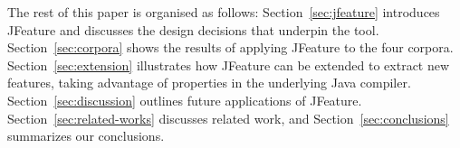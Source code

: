 The rest of this paper is organised as follows:
Section~\ref{sec:jfeature} introduces JFeature and discusses the design decisions that underpin the tool.
Section~\ref{sec:corpora} shows the results of applying JFeature to the four corpora.
Section~\ref{sec:extension} illustrates how JFeature can be extended to extract new features, taking advantage of properties in the underlying Java compiler.
Section~\ref{sec:discussion} outlines future applications of JFeature.
Section~\ref{sec:related-works} discusses related work, and
Section~\ref{sec:conclusions} summarizes our conclusions.
